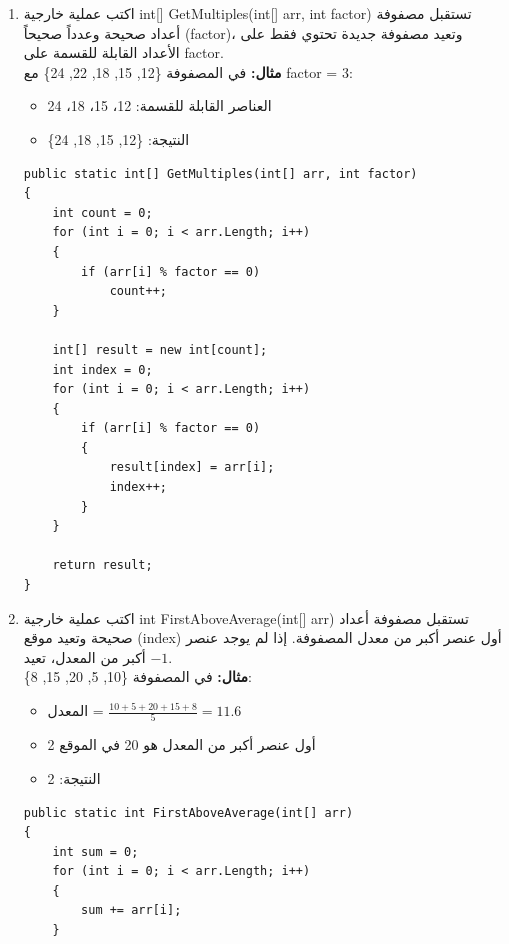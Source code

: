 \documentclass[14pt]{extarticle}
\begin{document}
\begin{enumerate}[resume, itemsep=2em]
    \item
    اكتب عملية خارجية \textenglish{int[] GetMultiples(int[] arr, int factor)} تستقبل مصفوفة أعداد صحيحة وعدداً صحيحاً (\textenglish{factor})، وتعيد مصفوفة جديدة تحتوي فقط على الأعداد القابلة للقسمة على \textenglish{factor}.\\
    \textbf{مثال:} في المصفوفة \textenglish{\{12, 15, 18, 22, 24\}} مع \textenglish{factor = 3}:
    \begin{itemize}
        \item العناصر القابلة للقسمة: 12، 15، 18، 24
        \item النتيجة: \textenglish{\{12, 15, 18, 24\}}
    \end{itemize}
    \ifwithsols
    \begin{boxSolution}
    \begin{english}
    \begin{verbatim}
public static int[] GetMultiples(int[] arr, int factor)
{
    int count = 0;
    for (int i = 0; i < arr.Length; i++)
    {
        if (arr[i] % factor == 0)
            count++;
    }

    int[] result = new int[count];
    int index = 0;
    for (int i = 0; i < arr.Length; i++)
    {
        if (arr[i] % factor == 0)
        {
            result[index] = arr[i];
            index++;
        }
    }

    return result;
}
    \end{verbatim}
    \end{english}
    \end{boxSolution}
    \fi

    \item
    اكتب عملية خارجية \textenglish{int FirstAboveAverage(int[] arr)} تستقبل مصفوفة أعداد صحيحة وتعيد موقع (index) أول عنصر أكبر من معدل المصفوفة. إذا لم يوجد عنصر أكبر من المعدل، تعيد $-1$.\\
    \textbf{مثال:} في المصفوفة \textenglish{\{10, 5, 20, 15, 8\}}:
    \begin{itemize}
        \item المعدل = $\frac{10+5+20+15+8}{5} = 11.6$
        \item أول عنصر أكبر من المعدل هو 20 في الموقع 2
        \item النتيجة: 2
    \end{itemize}
    \ifwithsols
    \begin{boxSolution}
    \begin{english}
    \begin{verbatim}
public static int FirstAboveAverage(int[] arr)
{
    int sum = 0;
    for (int i = 0; i < arr.Length; i++)
    {
        sum += arr[i];
    }


\end{verbatim}
\end{english}
\end{boxSolution}
\end{enumerate}
\end{document}
